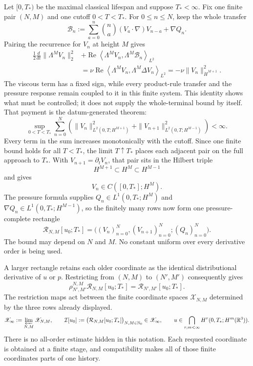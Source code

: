 Let \([0,T_*)\) be the maximal classical lifespan and suppose
\(T_*<\infty\).  Fix one finite pair \((N,M)\) and one cutoff
\(0<T<T_*\).  For \(0\le n\le N\), keep the whole transfer
\[
 \mathcal B_n
 :=\sum_{a=0}^{n}\binom na(V_a\!\cdot\nabla)V_{n-a}+\nabla Q_n.
\]
Pairing the recurrence for \(V_n\) at height \(M\) gives
\[
\begin{aligned}
 \frac12\frac{d}{dt}\|\Lambda^M V_n\|_2^2
 &+\operatorname{Re}\left\langle
   \Lambda^M V_n,\Lambda^M\mathcal B_n
  \right\rangle_{L^2}\\
 &=\nu\operatorname{Re}\left\langle
   \Lambda^M V_n,\Lambda^M\Delta V_n
  \right\rangle_{L^2}
 =-\nu\|V_n\|_{\dot H^{M+1}}^2.
\end{aligned}
\]
The viscous term has a fixed sign, while every product-rule transfer and the
pressure response remain coupled to it in this finite system.  This identity
shows what must be controlled; it does not supply the whole-terminal bound by
itself.  That payment is the datum-generated theorem:
\[
 \sup_{0<T<T_*}\sum_{n=0}^{N}\left(
  \|V_n\|_{L^2(0,T;H^{M+1})}^2
  +\|V_{n+1}\|_{L^2(0,T;H^{M-1})}^2
 \right)<\infty.
\]
Every term in the sum increases monotonically with the cutoff.  Since one
finite bound holds for all \(T<T_*\), the limit \(T\uparrow T_*\) places each
adjacent pair on the full approach to \(T_*\).  With
\(V_{n+1}=\partial_tV_n\), that pair sits in the Hilbert triple
\[
 H^{M+1}\subset H^M\subset H^{M-1}
\]
and gives
\[
 V_n\in C([0,T_*];H^M).
\]
The pressure formula supplies
\(Q_n\in L^1(0,T_*;H^M)\) and
\(\nabla Q_n\in L^1(0,T_*;H^{M-1})\), so the finitely many rows now form one
pressure-complete rectangle
\[
 \mathcal R_{N,M}[u_0;T_*]
 =\bigl((V_n)_{n=0}^{N},(V_{n+1})_{n=0}^{N};(Q_n)_{n=0}^{N}\bigr).
\]
The bound may depend on \(N\) and \(M\).  No constant uniform over every
derivative order is being used.

A larger rectangle retains each older coordinate as the identical
distributional derivative of \(u\) or \(p\).  Restricting from
\((N,M)\) to \((N',M')\) consequently gives
\[
 \rho_{N',M'}^{N,M}\mathcal R_{N,M}[u_0;T_*]
 =\mathcal R_{N',M'}[u_0;T_*].
\]
The restriction maps act between the finite coordinate spaces
\(\mathscr X_{N,M}\) determined by the three rows already displayed.
\[
 \mathscr X_\infty:=\varprojlim_{N,M}\mathscr X_{N,M},
 \qquad
 \mathcal I[u_0]
 :=\bigl(\mathcal R_{N,M}[u_0;T_*]\bigr)_{N,M\in\mathbb N_0}
 \in\mathscr X_\infty,
 \qquad
 u\in\bigcap_{r,m<\infty}H^r(0,T_*;H^m(\mathbb R^3)).
\]
There is no all-order estimate hidden in this notation.  Each requested
coordinate is obtained at a finite stage, and compatibility makes all of
those finite coordinates parts of one history.

